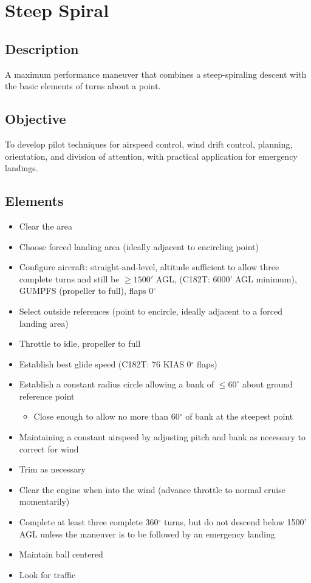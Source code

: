 \section{Steep Spiral}

\subsection{Description}

A maximum performance maneuver that combines a steep-spiraling descent with the
basic elements of turns about a point.

\subsection{Objective}

To develop pilot techniques for airspeed control, wind drift control, planning,
orientation, and division of attention, with practical application for
emergency landings.

\subsection{Elements}

\begin{itemize}
  \item Clear the area
  \item Choose forced landing area (ideally adjacent to encircling point) \item
    Configure aircraft: straight-and-level, altitude sufficient to allow three
    complete turns and still be $\geq 1500'$ AGL, (C182T: 6000' AGL minimum),
    GUMPFS (propeller to full), flaps 0$^\circ$ 
  \item Select outside references (point to encircle, ideally adjacent to a
    forced landing area)
  \item Throttle to idle, propeller to full 
  \item Establish best glide speed (C182T: 76 KIAS 0$^\circ$ flaps)
  \item Establish a constant radius circle allowing a bank of $\leq 60^\circ$
    about ground reference point 
    \begin{itemize}
      \item Close enough to allow no more than 60$^\circ$ of bank at the steepest point
    \end{itemize}
  \item Maintaining a constant airspeed by adjusting pitch and bank as
    necessary to correct for wind 
  \item Trim as necessary
  \item Clear the engine when into the wind (advance throttle to normal cruise
    momentarily)
  \item Complete at least three complete 360$^\circ$ turns, but do not descend below
    1500' AGL unless the maneuver is to be followed by an emergency landing
  \item Maintain ball centered
  \item Look for traffic
\end{itemize}

